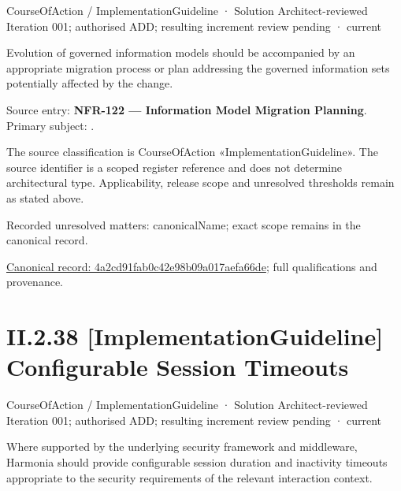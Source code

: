 \label{element:4a2cd91fab0c42e98b09a017aefa66de}
{\small CourseOfAction / ImplementationGuideline · Solution Architect-reviewed Iteration 001; authorised ADD; resulting increment review pending · current}\par

Evolution of governed information models should be accompanied by an appropriate migration process or plan addressing the governed information sets potentially affected by the change.



Source entry: \textbf{NFR-122 — Information Model Migration Planning}. Primary subject: \texttt{}.



The source classification is CourseOfAction «ImplementationGuideline». The source identifier is a scoped register reference and does not determine architectural type. Applicability, release scope and unresolved thresholds remain as stated above.


{\small Recorded unresolved matters: canonicalName; exact scope remains in the canonical record.}\par
{\footnotesize \href{../../../../../../../continuum/strategy/course-of-action/implementation-guideline/4a2cd91fab0c42e98b09a017aefa66de.md}{Canonical record: 4a2cd91fab0c42e98b09a017aefa66de}; full qualifications and provenance.}\par
\section*{II.2.38 [ImplementationGuideline] Configurable Session Timeouts}
\label{navigation:II.2.38}

\label{element:886896239b2e40b0b3bda53e922a2ab6}
{\small CourseOfAction / ImplementationGuideline · Solution Architect-reviewed Iteration 001; authorised ADD; resulting increment review pending · current}\par

Where supported by the underlying security framework and middleware, Harmonia should provide configurable session duration and inactivity timeouts appropriate to the security requirements of the relevant interaction context.



